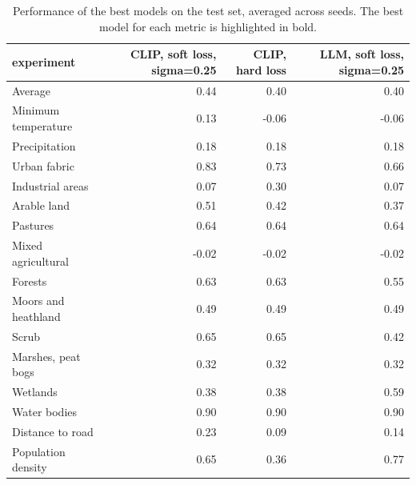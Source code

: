 \begin{table}
\caption{Performance of the best models on the test set, averaged across seeds. The best model for each metric is highlighted in bold.}
\label{tab:alignment_models}
\begin{tabular}{lrrr}
\toprule
experiment & CLIP, soft loss, sigma=0.25 & CLIP, hard loss & LLM, soft loss, sigma=0.25 \\
\midrule
Average & 0.44 & 0.40 & 0.40 \\
Minimum temperature & 0.13 & -0.06 & -0.06 \\
Precipitation & 0.18 & 0.18 & 0.18 \\
Urban fabric & 0.83 & 0.73 & 0.66 \\
Industrial areas & 0.07 & 0.30 & 0.07 \\
Arable land & 0.51 & 0.42 & 0.37 \\
Pastures & 0.64 & 0.64 & 0.64 \\
Mixed agricultural & -0.02 & -0.02 & -0.02 \\
Forests & 0.63 & 0.63 & 0.55 \\
Moors and heathland & 0.49 & 0.49 & 0.49 \\
Scrub & 0.65 & 0.65 & 0.42 \\
Marshes, peat bogs & 0.32 & 0.32 & 0.32 \\
Wetlands & 0.38 & 0.38 & 0.59 \\
Water bodies & 0.90 & 0.90 & 0.90 \\
Distance to road & 0.23 & 0.09 & 0.14 \\
Population density & 0.65 & 0.36 & 0.77 \\
\bottomrule
\end{tabular}
\end{table}
